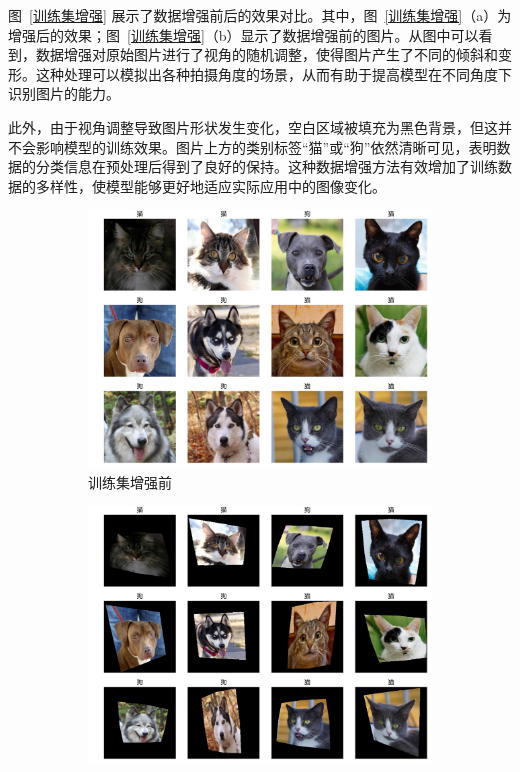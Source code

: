 图~\ref{训练集增强} 展示了数据增强前后的效果对比。其中，图~\ref{训练集增强}（a）为增强后的效果；图~\ref{训练集增强}（b）显示了数据增强前的图片。从图中可以看到，数据增强对原始图片进行了视角的随机调整，使得图片产生了不同的倾斜和变形。这种处理可以模拟出各种拍摄角度的场景，从而有助于提高模型在不同角度下识别图片的能力。

此外，由于视角调整导致图片形状发生变化，空白区域被填充为黑色背景，但这并不会影响模型的训练效果。图片上方的类别标签“猫”或“狗”依然清晰可见，表明数据的分类信息在预处理后得到了良好的保持。这种数据增强方法有效增加了训练数据的多样性，使模型能够更好地适应实际应用中的图像变化。

\begin{figure}[ht]
    \centering
    \begin{subfigure}[b]{0.48\linewidth}  %
        \centering
        \includegraphics[width=\linewidth]{image/6/original-images.jpg}
        \caption{训练集增强前}
        \label{训练集增强前}
    \end{subfigure}
    \hspace{0.01\linewidth}  %
    \begin{subfigure}[b]{0.48\linewidth}  %
        \centering
        \includegraphics[width=\linewidth]{image/6/enhanced-images.jpg}

\end{subfigure}
\end{figure}
